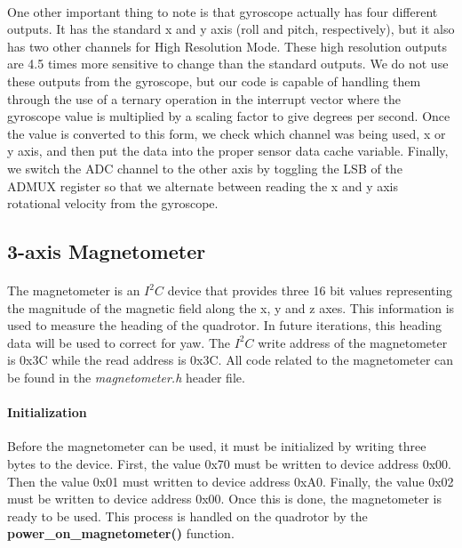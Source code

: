 \paragraph{}
One other important thing to note is that gyroscope actually has four different outputs.  It has the standard x and y axis (roll and pitch, respectively), but it also has two other channels for High Resolution Mode.  These high resolution outputs are 4.5 times more sensitive to change than the standard outputs.  We do not use these outputs from the gyroscope, but our code is capable of handling them through the use of a ternary operation in the interrupt vector where the gyroscope value is multiplied by a scaling factor to give degrees per second.  Once the value is converted to this form, we check which channel was being used, x or y axis, and then put the data into the proper sensor data cache variable.  Finally, we switch the ADC channel to the other axis by toggling the LSB of the ADMUX register so that we alternate between reading the x and y axis rotational velocity from the gyroscope.

\subsection{3-axis Magnetometer}

\paragraph{}
The magnetometer is an $I^{2}C$ device that provides three 16 bit values representing the magnitude of the magnetic field along the x, y and z axes.  This information is used to measure the heading of the quadrotor.  In future iterations, this heading data will be used to correct for yaw.  The $I^{2}C$ write address of the magnetometer is 0x3C while the read address is 0x3C.  All code related to the magnetometer can be found in the {\it magnetometer.h} header file.

\paragraph{Initialization}
Before the magnetometer can be used, it must be initialized by writing three bytes to the device.  First, the value 0x70 must be written to device address 0x00.  Then the value 0x01 must written to device address 0xA0.  Finally, the value 0x02 must be written to device address 0x00.  Once this is done, the magnetometer is ready to be used.  This process is handled on the quadrotor by the {\bf power\_on\_magnetometer()} function.

